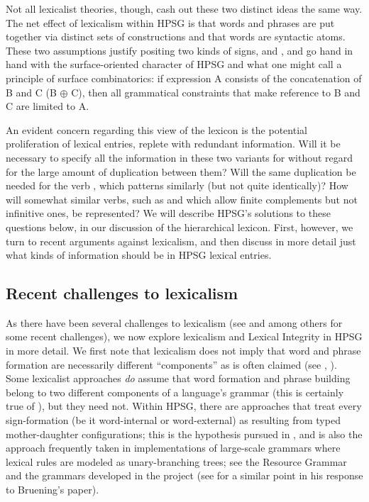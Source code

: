\documentclass[output=paper,biblatex,babelshorthands,newtxmath,draftmode,colorlinks,citecolor=brown]{langscibook}
\begin{document}
\noindent
Not all lexicalist theories, though, cash out these two
distinct ideas the same way. The net effect of lexicalism within HPSG is that words and phrases are
put together via distinct sets of constructions and that words are syntactic atoms. These two
assumptions justify positing two kinds of signs,  and , and go
hand in hand with the surface-oriented character of HPSG and what one might call a principle of
surface combinatorics: if expression A consists of the concatenation of B and C (B $\oplus$ C), then
all grammatical constraints that make reference to B and C are limited to A.  


An evident concern regarding this view of the lexicon is the potential proliferation of lexical
entries, replete with redundant information. Will it be necessary to specify all the information in
these two variants for  without regard for the large amount of duplication between
them? Will the same duplication be needed for the verb , which patterns similarly (but
not quite identically)? How will somewhat similar verbs, such as  and
 which allow finite complements but not infinitive ones, be represented? We will
describe HPSG's solutions to these questions below, in our discussion of the hierarchical
lexicon. First, however, we turn to recent arguments against lexicalism, and then discuss in more
detail just what kinds of information should be in HPSG lexical entries.

\subsection{Recent challenges to lexicalism}

As there have been several challenges to lexicalism (see \citealt{Bruening2018} and
\citealt{Haspelmath2011} among others for some recent challenges), we now explore lexicalism and
Lexical Integrity in HPSG in more detail. We first note that lexicalism does
not imply that word and phrase formation are necessarily different ``components'' as is often
claimed (see \citealt{Marantz1997}, \citealt{Bruening2018}). Some lexicalist approaches \emph{do}
assume that word formation and phrase building belong to two different components of a language's
grammar (this is certainly true of \citealt{Jackendoff1975}), but they need not. Within HPSG, there
are approaches that treat every sign-formation (be it word-internal or word-external) as resulting
from typed mother-daughter configurations; this is the hypothesis pursued in \citealt{Koenig1999c},
and is also the approach frequently taken in implementations of large-scale grammars where lexical
rules are modeled as unary-branching trees; see the  Resource Grammar
\citep{Copestake2002} and the grammars developed in the  project \citep{Mueller2015}
(see \citealt[58]{MuellerLexicalism} for a similar point in his response to Bruening's paper).
\end{document}
